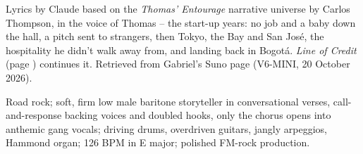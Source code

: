 
\label{sec:wheels-up}
\begin{notes}
Lyrics by Claude based on the \emph{Thomas' Entourage} narrative universe by Carlos Thompson, in the voice of Thomas -- the start-up years: no job and a baby down the hall, a pitch sent to strangers, then Tokyo, the Bay and San José, the hospitality he didn't walk away from, and landing back in Bogotá. \emph{Line of Credit} (page \pageref{sec:line-of-credit}) continues it. Retrieved from Gabriel's Suno page (V6-MINI, 20 October 2026).
\end{notes}
\begin{style}
Road rock; soft, firm low male baritone storyteller in conversational verses, call-and-response backing voices and doubled hooks, only the chorus opens into anthemic gang vocals; driving drums, overdriven guitars, jangly arpeggios, Hammond organ; 126 BPM in E major; polished FM-rock production.
\end{style}
